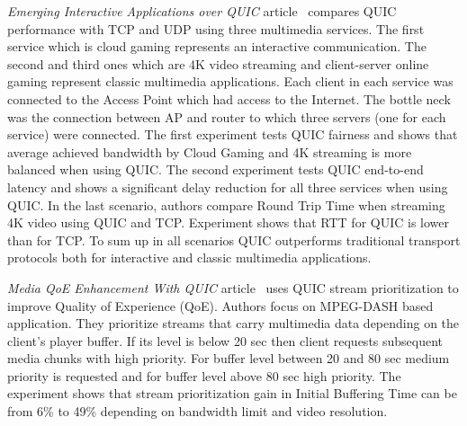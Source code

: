 \textit{Emerging Interactive Applications over QUIC} article~\cite{9045245} compares QUIC performance with TCP and UDP
using three multimedia services.
The first service which is cloud gaming represents an interactive communication.
The second and third ones which are 4K video streaming and client-server online gaming represent classic multimedia
applications.
Each client in each service was connected to the Access Point which had access to the Internet.
The bottle neck was the connection between AP and router to which three servers (one for each service) were connected.
The first experiment tests QUIC fairness and shows that average achieved bandwidth by Cloud Gaming and 4K streaming
is more balanced when using QUIC\@.
The second experiment tests QUIC end-to-end latency and shows a significant delay reduction for all three services when using QUIC\@.
In the last scenario, authors compare Round Trip Time when streaming 4K video using QUIC and TCP\@.
Experiment shows that RTT for QUIC is lower than for TCP\@.
To sum up in all scenarios QUIC outperforms traditional transport protocols both for interactive and classic multimedia
applications.

\textit{Media QoE Enhancement With QUIC} article~\cite{7562075} uses QUIC stream prioritization to improve Quality of Experience (QoE).
Authors focus on MPEG-DASH based application.
They prioritize streams that carry multimedia data depending on the client's player buffer.
If its level is below 20 sec then client requests subsequent media chunks with high priority.
For buffer level between 20 and 80 sec medium priority is requested and for buffer level above 80 sec high priority.
The experiment shows that stream prioritization gain in Initial Buffering Time can be from 6\% to 49\% depending on
bandwidth limit and video resolution.
%
%
%
%

